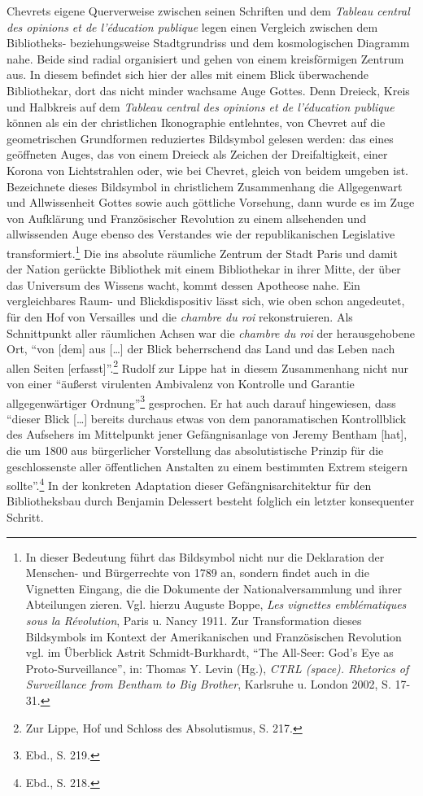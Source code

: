 Chevrets eigene Querverweise zwischen seinen Schriften und dem
\emph{Tableau central des opinions et de l'éducation publique} legen
einen Vergleich zwischen dem Bibliotheks- beziehungsweise Stadtgrundriss
und dem kosmologischen Diagramm nahe. Beide sind radial organisiert und
gehen von einem kreisförmigen Zentrum aus. In diesem befindet sich hier
der alles mit einem Blick überwachende Bibliothekar, dort das nicht
minder wachsame Auge Gottes. Denn Dreieck, Kreis und Halbkreis auf dem
\emph{Tableau central des opinions et de l'éducation publique} können
als ein der christlichen Ikonographie entlehntes, von Chevret auf die
geometrischen Grundformen reduziertes Bildsymbol gelesen werden: das
eines geöffneten Auges, das von einem Dreieck als Zeichen der
Dreifaltigkeit, einer Korona von Lichtstrahlen oder, wie bei Chevret,
gleich von beidem umgeben ist. Bezeichnete dieses Bildsymbol in
christlichem Zusammenhang die Allgegenwart und Allwissenheit Gottes
sowie auch göttliche Vorsehung, dann wurde es im Zuge von Aufklärung und
Französischer Revolution zu einem allsehenden und allwissenden Auge
ebenso des Verstandes wie der republikanischen Legislative
transformiert.\footnote{In dieser Bedeutung führt das Bildsymbol nicht
  nur die Deklaration der Menschen- und Bürgerrechte von 1789 an,
  sondern findet auch in die Vignetten Eingang, die die Dokumente der
  Nationalversammlung und ihrer Abteilungen zieren. Vgl. hierzu Auguste
  Boppe, \emph{Les vignettes emblématiques sous la Révolution}, Paris u.
  Nancy 1911. Zur Transformation dieses Bildsymbols im Kontext der
  Amerikanischen und Französischen Revolution vgl. im Überblick Astrit
  Schmidt-Burkhardt, \enquote{The All-Seer: God's Eye as
  Proto-Surveillance}, in: Thomas Y. Levin (Hg.), \emph{CTRL (space).
  Rhetorics of Surveillance from Bentham to Big Brother}, Karlsruhe u.
  London 2002, S. 17-31.} Die ins absolute räumliche Zentrum der Stadt
Paris und damit der Nation gerückte Bibliothek mit einem Bibliothekar in
ihrer Mitte, der über das Universum des Wissens wacht, kommt dessen
Apotheose nahe. Ein vergleichbares Raum- und Blickdispositiv lässt sich,
wie oben schon angedeutet, für den Hof von Versailles und die
\emph{chambre du roi} rekonstruieren. Als Schnittpunkt aller räumlichen
Achsen war die \emph{chambre du roi} der herausgehobene Ort,
\enquote{von {[}dem{]} aus {[}\ldots{}{]} der Blick beherrschend das
Land und das Leben nach allen Seiten {[}erfasst{]}}.\footnote{Zur Lippe,
  Hof und Schloss des Absolutismus, S. 217.} Rudolf zur Lippe hat in
diesem Zusammenhang nicht nur von einer \enquote{äußerst virulenten
Ambivalenz von Kontrolle und Garantie allgegenwärtiger
Ordnung}\footnote{Ebd., S. 219.} gesprochen. Er hat auch darauf
hingewiesen, dass \enquote{dieser Blick {[}\ldots{}{]} bereits durchaus
etwas von dem panoramatischen Kontrollblick des Aufsehers im Mittelpunkt
jener Gefängnisanlage von Jeremy Bentham {[}hat{]}, die um 1800 aus
bürgerlicher Vorstellung das absolutistische Prinzip für die
geschlossenste aller öffentlichen Anstalten zu einem bestimmten Extrem
steigern sollte}.\footnote{Ebd., S. 218.} In der konkreten Adaptation
dieser Gefängnisarchitektur für den Bibliotheksbau durch Benjamin
Delessert besteht folglich ein letzter konsequenter Schritt.

